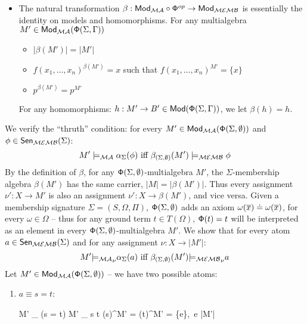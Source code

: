 \documentclass[10pt]{article}
\begin{document}
\begin{PROOF}
\begin{itemize}
%		
\item The natural transformation $\beta: {\sf {Mod}}_{{\mathcal{MA}}} \circ 
{\sf {\Phi}}^{op} \to {\sf {Mod}}_{{\mathcal{MEMB}}}$ is essentially the identity on models and homomorphisms.
For any multialgebra $M' \in {\sf {Mod}}_{{\mathcal{MA}}}({\sf {\Phi}}(\Sigma,\Gamma))$
			\begin{itemize}
			\item $|\beta(M')| = |M'|$
			\item $f(x_1, \ldots ,x_n)^{\beta(M')} = x$ such that
			$f(x_1, \ldots ,x_n)^{M'}=\{x\}$
			\item $p^{\beta(M')} = p^{M'}$
			\end{itemize}
For any homomorphisms:  $h: M' \to B' \in {\sf {Mod}}({\sf {\Phi}}(\Sigma,\Gamma))$, we let $\beta(h)=h$.
	\end{itemize}
We verify the ``thruth'' condition: for every
$M'\in{\sf {Mod}}_{{\mathcal{MA}}}({\sf {\Phi}}(\Sigma,\emptyset))$ and $\phi \in {\sf {Sen}}_{{\mathcal{MEMB}}}(\Sigma)$:
\begin{equation} \label{eq:tc}
M' \models_{{\mathcal{MA}}} \alpha_{\Sigma}(\phi) \mbox{ iff } 
\beta_{(\Sigma,\emptyset)} (M') \models_{{\mathcal{MEMB}}} \phi 
\end{equation}
By the definition of
$\beta$, for any ${\sf {\Phi}}(\Sigma,\emptyset)$-multialgebra $M'$, the
$\Sigma$-membership algebra $\beta(M')$ has the same carrier, 
$|M|= |\beta(M')|$. Thus every assignment
$\nu': X \to M'$ is also an assignment $\nu': X \to \beta(M')$, and vice
versa.  Given
a membership signature $\Sigma=(S,\Omega,\Pi)$, ${\sf {\Phi}}(\Sigma,\emptyset)$
adds an axiom $\omega(\overline{x}) \mathrel{\dot{=} } \omega(\overline{x})$, for every
$\omega \in \Omega$ -- thus for any ground term $t\in T(\Omega)$, ${\sf {\Phi}}(t)=t$
will be interpreted as an element in every
${\sf {\Phi}}(\Sigma,\emptyset)$-multialgebra $M'$.  We show that for every atom $a \in
{\sf {Sen}}_{{\mathcal{MEMB}}}(\Sigma)$ and for any assignment $\nu:X\to|M'|$:
\begin{equation} \label{eq:tca}
M' {\models_{{\mathcal{MA}}}}_{\nu} \alpha_{\Sigma}(a) \mbox{ iff 
} \beta_{(\Sigma,\emptyset)} (M') {\models_{{\mathcal{MEMB}}}}_{\nu} a 
\end{equation}
%
Let $M'\in{\sf {Mod}}_{{\mathcal{MA}}}({\sf {\Phi}}(\Sigma,\emptyset))$ -- we have two possible atoms:
	\begin{enumerate}
	\item $a \equiv s = t$:
		\begin{eqp}
			M' \models_{\nu} \alpha(s = t)
			M' \models_{\nu} s \eleq t
			{\nu}(s)^{M'} = {\nu}(t)^{M'} = \{e\},\ e \in |M'|

\end{eqp}
\end{enumerate}
\end{PROOF}
\end{document}
